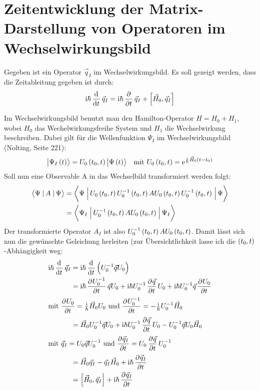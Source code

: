 \section{Zeitentwicklung der Matrix-Darstellung von Operatoren im Wechselwirkungsbild}

Gegeben ist ein Operator $\vec{q}_I$ im Wechselwirkungsbild. Es soll gezeigt werden, dass die Zeitableitung gegeben ist durch:
\[
	\ii\hbar\dod{}{t}\vec{q}_I=\ii\hbar\dpd{}{t}\vec{q}_I+\left[\vec{H}_0,\vec{q}_I\right]
\]

Im Wechselwirkungsbild benutzt man den Hamilton-Operator $H=H_0+H_1$, wobei $H_0$ das Wechelwirkungsfreihe System und $H_1$ die Wechselwirkung beschreiben. Dabei gilt für die Wellenfunktion $\Psi_I$ im Wechselwirkungsbild (Nolting, Seite 221):
\begin{align*}
	\ket{\Psi_I\del{t}}=U_0\del{t_0,t}\ket{\Psi\del{t}}&&\text{mit }U_0\del{t_0,t}=\ee^{\frac{\ii}{\hbar}\vec{H}_0\del{t-t_0}}
\end{align*}
Soll nun eine Observable A in das Wechselbild transformiert werden folgt:
\begin{align*}
	\braopket{\Psi}{A}{\Psi}&=\braopket{\Psi}{U_0\del{t_0,t}U_0^{-1}\del{t_0,t}AU_0\del{t_0,t}U_0^{-1}\del{t_0,t}}{\Psi}\\
	&=\braopket{\Psi_I}{U_0^{-1}\del{t_0,t}AU_0\del{t_0,t}}{\Psi_I}\\
\end{align*}
Der transformierte Operator $A_I$ ist also $U_0^{-1}\del{t_0,t}AU_0\del{t_0,t}$. Damit lässt sich nun die gewünschte Geleichung herleiten (zur Übersichtlichkeit lasse ich die $\del{t_0,t}$-Abhängigkeit weg:
\begin{align*}
	\ii\hbar\dod{}{t}\vec{q}_I&=\ii\hbar\dod{}{t}\del{U_0^{-1}\vec{q}U_0}\\
	&=\ii\hbar\dpd{U_0^{-1}}{t}\vec{q}U_0+\ii\hbar U_0^{-1}\dpd{\vec{q}}{t}U_0+\ii\hbar U_0^{-1}\vec{q}\dpd{U_0}{t}\\
	\intertext{%
		mit $\dpd{U_0}{t}=\frac{\ii}{\hbar}\vec{H}_0U_0$ und $\dpd{U_0^{-1}}{t}=-\frac{\ii}{\hbar}U_0^{-1}\vec{H}_0$
	}
	&=\vec{H}_0U_0^{-1}\vec{q}U_0+\ii\hbar U_0^{-1}\dpd{\vec{q}}{t}U_0-U_0^{-1}\vec{q}U_0\vec{H}_0\\
	\intertext{%
		mit $\vec{q}_I=U_0\vec{q}U_0^{-1}$ und $\dpd{\vec{q}_I}{t}=U_0\dpd{\vec{q}}{t}U_0^{-1}$
	}
	&=\vec{H}_0\vec{q}_I-\vec{q}_I\vec{H}_0+\ii\hbar\dpd{\vec{q}_I}{t}\\
	&=\left[\vec{H}_0,\vec{q}_I\right]+\ii\hbar\dpd{\vec{q}_I}{t}
\end{align*}



